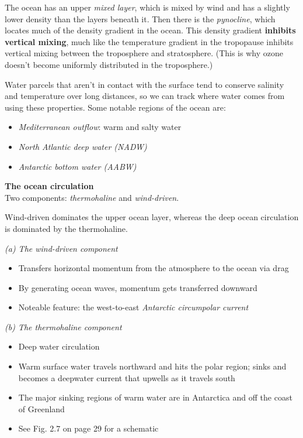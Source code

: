 \documentclass[11pt]{article}
\numberwithin{equation}{section}
\begin{document}
The ocean has an upper \textit{mixed layer}, which is mixed by wind and has a slightly lower density than the layers beneath it. Then there is the \textit{pynocline}, which locates much of the density gradient in the ocean. This density gradient \textbf{inhibits vertical mixing}, much like the temperature gradient in the tropopause inhibits vertical mixing between the troposphere and stratosphere. (This is why ozone doesn't become uniformly distributed in the troposphere.)

Water parcels that aren't in contact with the surface tend to conserve salinity and temperature over long distances, so we can track where water comes from using these properties. Some notable regions of the ocean are:
\begin{itemize}
\item \textit{Mediterranean outflow}: warm and salty water 
\item \textit{North Atlantic deep water (NADW)}
\item \textit{Antarctic bottom water (AABW)}
\end{itemize}

\textbf{The ocean circulation}\\
Two components: \textit{thermohaline} and \textit{wind-driven}. 

Wind-driven dominates the upper ocean layer, whereas the deep ocean circulation is dominated by the thermohaline.

\textit{(a) The wind-driven component}
\begin{itemize}
\item Transfers horizontal momentum from the atmosphere to the ocean via drag 
\item By generating ocean waves, momentum gets transferred downward 
\item Noteable feature: the west-to-east \textit{Antarctic circumpolar current}
\end{itemize}

\textit{(b) The thermohaline component}
\begin{itemize}
\item Deep water circulation
\item Warm surface water travels northward and hits the polar region; sinks and becomes a deepwater current  that upwells as it travels south
\item The major sinking regions of warm water are in Antarctica and off the coast of Greenland 
\item See Fig. 2.7 on page 29 for a schematic 
\end{itemize}
\end{document}
